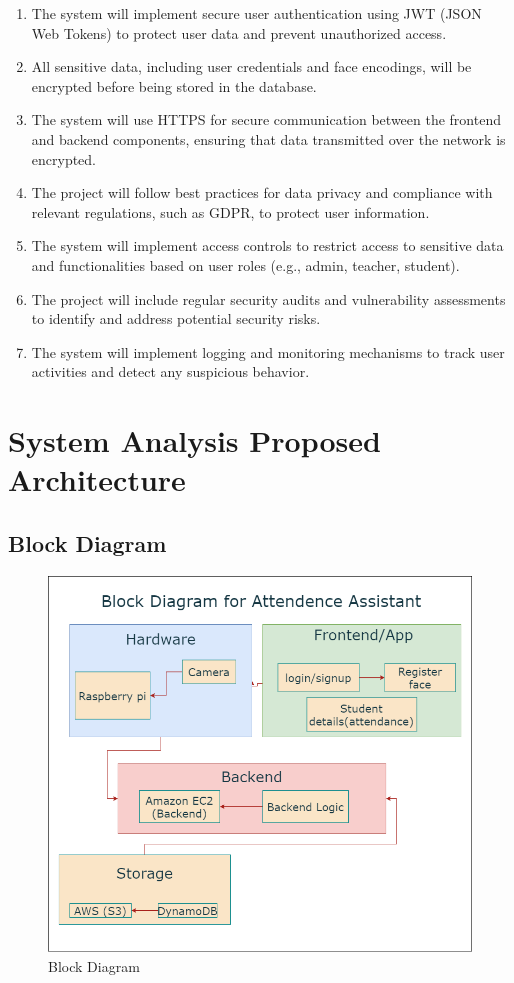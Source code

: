 \documentclass[openany]{report}
\begin{document}
\begin{enumerate}
    \item The system will implement secure user authentication using JWT (JSON Web Tokens) to protect user data and prevent unauthorized access.
    \item All sensitive data, including user credentials and face encodings, will be encrypted before being stored in the database.
    \item The system will use HTTPS for secure communication between the frontend and backend components, ensuring that data transmitted over the network is encrypted.
    \item The project will follow best practices for data privacy and compliance with relevant regulations, such as GDPR, to protect user information.
    \item The system will implement access controls to restrict access to sensitive data and functionalities based on user roles (e.g., admin, teacher, student).
    \item The project will include regular security audits and vulnerability assessments to identify and address potential security risks.
    \item The system will implement logging and monitoring mechanisms to track user activities and detect any suspicious behavior.
\end{enumerate}


\chapter{System Analysis Proposed Architecture}

\section{Block Diagram}
\begin{figure}[H]
    \centering
    \includegraphics[width=.75\textwidth]{../imgs/block diagram.png}
    \caption{Block Diagram}
\end{figure}
\end{document}
